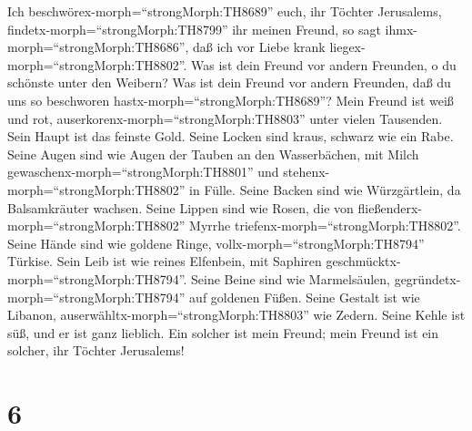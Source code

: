 Ich beschwörex-morph=``strongMorph:TH8689'' euch, ihr Töchter
Jerusalems, findetx-morph=``strongMorph:TH8799'' ihr meinen Freund, so
sagt ihmx-morph=``strongMorph:TH8686'', daß ich vor Liebe krank
liegex-morph=``strongMorph:TH8802''.  Was ist dein Freund
vor andern Freunden, o du schönste unter den Weibern? Was ist dein
Freund vor andern Freunden, daß du uns so beschworen
hastx-morph=``strongMorph:TH8689''?  Mein Freund ist weiß
und rot, auserkorenx-morph=``strongMorph:TH8803'' unter vielen
Tausenden.  Sein Haupt ist das feinste Gold. Seine Locken
sind kraus, schwarz wie ein Rabe.  Seine Augen sind wie
Augen der Tauben an den Wasserbächen, mit Milch
gewaschenx-morph=``strongMorph:TH8801'' und
stehenx-morph=``strongMorph:TH8802'' in Fülle.  Seine
Backen sind wie Würzgärtlein, da Balsamkräuter wachsen. Seine Lippen
sind wie Rosen, die von fließenderx-morph=``strongMorph:TH8802'' Myrrhe
triefenx-morph=``strongMorph:TH8802''.  Seine Hände sind
wie goldene Ringe, vollx-morph=``strongMorph:TH8794'' Türkise. Sein Leib
ist wie reines Elfenbein, mit Saphiren
geschmücktx-morph=``strongMorph:TH8794''.  Seine Beine sind
wie Marmelsäulen, gegründetx-morph=``strongMorph:TH8794'' auf goldenen
Füßen. Seine Gestalt ist wie Libanon,
auserwähltx-morph=``strongMorph:TH8803'' wie Zedern.  Seine
Kehle ist süß, und er ist ganz lieblich. Ein solcher ist mein Freund;
mein Freund ist ein solcher, ihr Töchter Jerusalems!

\hypertarget{section-5}{%
\section{6}\label{section-5}}

